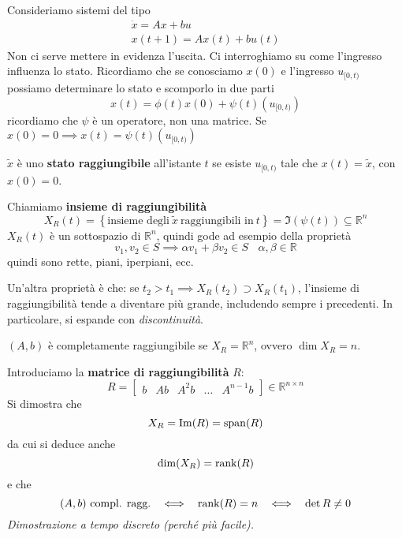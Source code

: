 Consideriamo sistemi del tipo
\begin{gather*}
	\dot{x} =Ax+bu\\
	x(t+1) =Ax(t) +bu(t)
\end{gather*}
Non ci serve mettere in evidenza l'uscita. Ci interroghiamo su come l'ingresso influenza lo stato. Ricordiamo che se conosciamo $x(0)$ e l'ingresso $u_{[ 0,t)}$ possiamo determinare lo stato e scomporlo in due parti
\begin{equation*}
	x(t) =\phi (t) x(0) +\psi (t)\left( u_{[ 0,t)}\right)
\end{equation*}
ricordiamo che $\psi $ è un operatore, non una matrice. Se $x(0) =0\implies x(t) =\psi (t)\left( u_{[ 0,t)}\right)$
\begin{defn}
	$\tilde{x}$ è uno \textbf{stato raggiungibile} all'istante $t$ se esiste $u_{[ 0,t)}$ tale che $x(t) =\tilde{x}$, con $x(0) =0$.
\end{defn}
Chiamiamo \textbf{insieme di raggiungibilità}
\begin{equation*}
	X_R(t) =\left\{\text{insieme degli} \ \tilde{x} \ \text{raggiungibili in} \ t\right\} =\Im(\psi (t)) \subseteq \mathbb{R}^n
\end{equation*}
$X_R(t)$ è un sottospazio di $\mathbb{R}^n$, quindi gode ad esempio della proprietà
\begin{equation*}
	v_1 ,v_2 \in S\implies \alpha v_1 +\beta v_2 \in S\ \ \ \ \alpha ,\beta \in \mathbb{R}
\end{equation*}
quindi sono rette, piani, iperpiani, ecc.

Un'altra proprietà è che: se $t_2  >t_1 \implies X_R(t_2) \supset X_R(t_1)$, l'insieme di raggiungibilità tende a diventare più grande, includendo sempre i precedenti. In particolare, si espande con \textit{discontinuità}.
\begin{defn}
	$(A,b)$ è completamente raggiungibile se $X_R =\mathbb{R}^n$, ovvero $\dim X_R =n$.
\end{defn}
Introduciamo la \textbf{matrice di raggiungibilità} $R$:
\begin{equation*}
	\boxed{
		R=\begin{bmatrix}
		b & Ab & A^2 b & \dotsc  & A^{n-1} b
		\end{bmatrix} \in \mathbb{R}^{n\times n}
	}
\end{equation*}
Si dimostra che
\begin{equation*}
	X_R =\operatorname{Im}(R) =\operatorname{span}(R)
\end{equation*}
da cui si deduce anche
\begin{equation*}
	\dim(X_R) =\operatorname*{rank}(R)
\end{equation*}
e che
\begin{equation*}
	(A,b) \ \text{compl. ragg.} \ \ \iff \ \ \rank(R) =n\ \ \iff \ \ \det R\neq 0
\end{equation*}
\textit{Dimostrazione a tempo discreto (perché più facile).}

